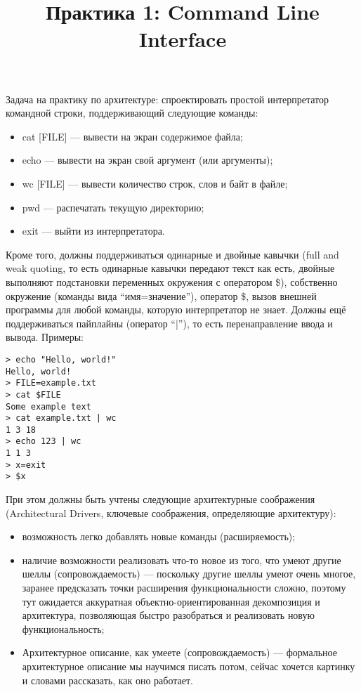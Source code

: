 \documentclass[a5paper]{article}
\title{Практика 1: Command Line Interface}
\date{}
\begin{document}
\maketitle
\thispagestyle{empty}

Задача на практику по архитектуре: спроектировать простой интерпретатор командной строки, поддерживающий следующие команды:

\begin{itemize}
	\item cat [FILE] --- вывести на экран содержимое файла;
	\item echo --- вывести на экран свой аргумент (или аргументы);
	\item wc [FILE] --- вывести количество строк, слов и байт в файле;
	\item pwd --- распечатать текущую директорию;
	\item exit --- выйти из интерпретатора.
\end{itemize}

Кроме того, должны поддерживаться одинарные и двойные кавычки (full and weak quoting, то есть одинарные кавычки передают текст как есть, двойные выполняют подстановки переменных окружения с оператором \$), собственно окружение (команды вида ``имя=значение''), оператор \$, вызов внешней программы для любой команды, которую интерпретатор не знает. Должны ещё поддерживаться пайплайны (оператор ``|''), то есть перенаправление ввода и вывода. Примеры:

\begin{verbatim}
> echo "Hello, world!"
Hello, world!
> FILE=example.txt
> cat $FILE
Some example text
> cat example.txt | wc
1 3 18
> echo 123 | wc
1 1 3
> x=exit
> $x
\end{verbatim}

При этом должны быть учтены следующие архитектурные соображения (Architectural Drivers, ключевые соображения, определяющие архитектуру):

\begin{itemize}
	\item возможность легко добавлять новые команды (расширяемость);
	\item наличие возможности реализовать что-то новое из того, что умеют другие шеллы (сопровождаемость) --- поскольку другие шеллы умеют очень многое, заранее предсказать точки расширения функциональности сложно, поэтому тут ожидается аккуратная объектно-ориентированная декомпозиция и архитектура, позволяющая быстро разобраться и реализовать новую функциональность;
	\item Архитектурное описание, как умеете (сопровождаемость) --- формальное архитектурное описание мы научимся писать потом, сейчас хочется картинку и словами рассказать, как оно работает.
\end{itemize}
\end{document}
